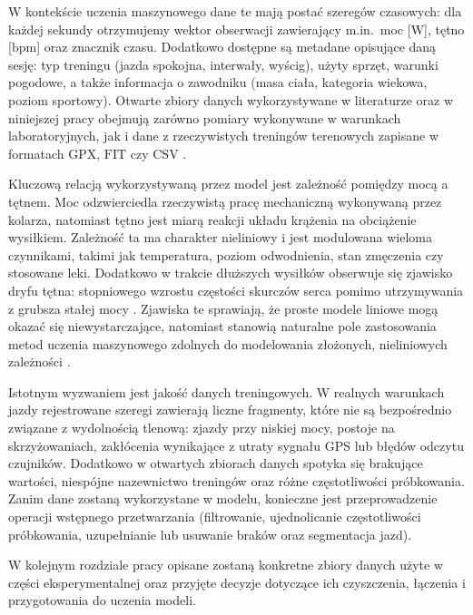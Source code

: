 W kontekście uczenia maszynowego dane te mają postać szeregów czasowych: dla każdej sekundy otrzymujemy wektor obserwacji zawierający m.in.\ moc [$\mathrm{W}$], tętno [$\mathrm{bpm}$] oraz znacznik czasu.
Dodatkowo dostępne są metadane opisujące daną sesję: typ treningu (jazda spokojna, interwały, wyścig), użyty sprzęt, warunki pogodowe, a także informacja o zawodniku (masa ciała, kategoria wiekowa, poziom sportowy).
Otwarte zbiory danych wykorzystywane w literaturze oraz w niniejszej pracy obejmują zarówno pomiary wykonywane w warunkach laboratoryjnych, jak i dane z rzeczywistych treningów terenowych zapisane w formatach $\mathrm{GPX}$, $\mathrm{FIT}$ czy $\mathrm{CSV}$ \cite{kaggle_cycling_data,figshare_cycling_data,stockwell2023mlftp}.

Kluczową relacją wykorzystywaną przez model jest zależność pomiędzy mocą a tętnem.
Moc odzwierciedla rzeczywistą pracę mechaniczną wykonywaną przez kolarza, natomiast tętno jest miarą reakcji układu krążenia na obciążenie wysiłkiem.
Zależność ta ma charakter nieliniowy i jest modulowana wieloma czynnikami, takimi jak temperatura, poziom odwodnienia, stan zmęczenia czy stosowane leki.
Dodatkowo w trakcie dłuższych wysiłków obserwuje się zjawisko dryfu tętna: stopniowego wzrostu częstości skurczów serca pomimo utrzymywania z grubsza stałej mocy \cite{borszcz2018ftp,karsten2021cpftp}.
Zjawiska te sprawiają, że proste modele liniowe mogą okazać się niewystarczające, natomiast stanowią naturalne pole zastosowania metod uczenia maszynowego zdolnych do modelowania złożonych, nieliniowych zależności \cite{stockwell2023mlftp,denham2020predictftp}.

Istotnym wyzwaniem jest jakość danych treningowych.
W realnych warunkach jazdy rejestrowane szeregi zawierają liczne fragmenty, które nie są bezpośrednio związane z wydolnością tlenową: zjazdy przy niskiej mocy, postoje na skrzyżowaniach, zakłócenia wynikające z utraty sygnału GPS lub błędów odczytu czujników.
Dodatkowo w otwartych zbiorach danych spotyka się brakujące wartości, niespójne nazewnictwo treningów oraz różne częstotliwości próbkowania.
Zanim dane zostaną wykorzystane w modelu, konieczne jest przeprowadzenie operacji wstępnego przetwarzania (filtrowanie, ujednolicanie częstotliwości próbkowania, uzupełnianie lub usuwanie braków oraz segmentacja jazd).

W kolejnym rozdziale pracy opisane zostaną konkretne zbiory danych użyte w części eksperymentalnej oraz przyjęte decyzje dotyczące ich czyszczenia, łączenia i przygotowania do uczenia modeli.

